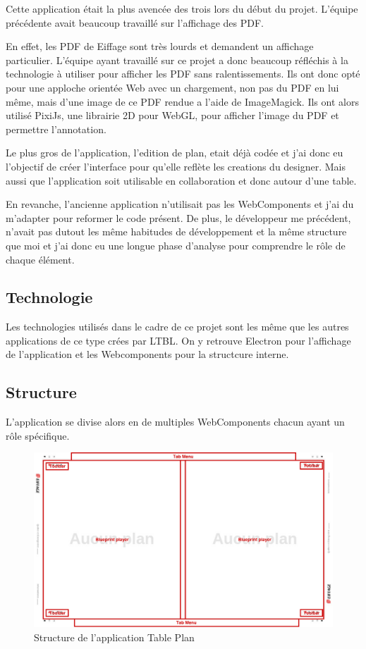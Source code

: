 Cette application était la plus avencée des trois lors du début du projet.
L'équipe précédente avait beaucoup travaillé sur l'affichage des PDF.

En effet, les PDF de Eiffage sont très lourds et demandent un affichage particulier.
L'équipe ayant travaillé sur ce projet a donc beaucoup réfléchis à la technologie à utiliser pour afficher les PDF sans ralentissements.
Ils ont donc opté pour une apploche orientée Web avec un chargement, non pas du PDF en lui même, mais d'une image de ce PDF rendue a l'aide de ImageMagick.
Ils ont alors utilisé PixiJs, une librairie 2D pour WebGL, pour afficher l'image du PDF et permettre l'annotation.

Le plus gros de l'application, l'edition de plan, etait déjà codée et j'ai donc eu l'objectif de créer l'interface pour qu'elle reflète les creations du designer.
Mais aussi que l'application soit utilisable en collaboration et donc autour d'une table.

En revanche, l'ancienne application n'utilisait pas les WebComponents et j'ai du m'adapter pour reformer le code présent.
De plus, le développeur me précédent, n'avait pas dutout les même habitudes de développement et la même structure que moi et j'ai donc eu une longue phase d'analyse pour comprendre le rôle de chaque élément.

\subsection{Technologie}
\label{eiffageTablePlanTechnologie}

Les technologies utilisés dans le cadre de ce projet sont les même que les autres applications de ce type crées par LTBL.
On y retrouve Electron pour l'affichage de l'application et les Webcomponents pour la structcure interne.

\subsection{Structure}
\label{eiffageTablePlanStructure}

L'application se divise alors en de multiples WebComponents chacun ayant un rôle spécifique.

\begin{figure}[h]
    \centering
    \includegraphics[scale=0.5]{img/table-plan-structure.pdf}
    \caption{Structure de l'application Table Plan}
\end{figure}

